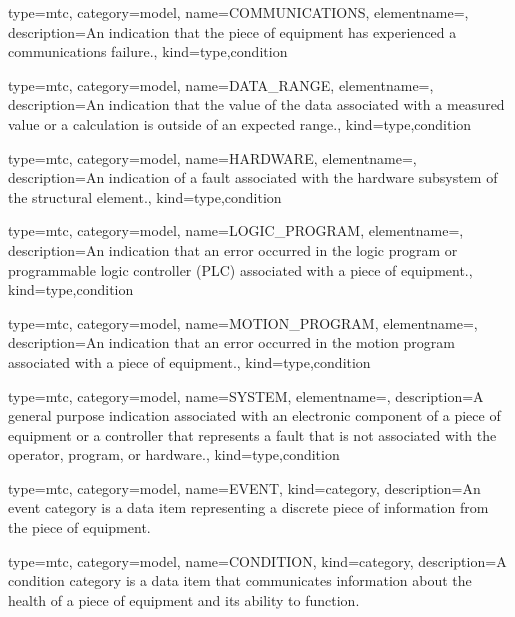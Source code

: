 {
  type=mtc,
  category=model,
  name={COMMUNICATIONS},
  elementname=,
  description={An indication that the piece of equipment has experienced a communications failure.},
  kind={type,condition}
}


{
  type=mtc,
  category=model,
  name={DATA\_RANGE},
  elementname=,
  description={An indication that the value of the data associated with a measured value or a calculation is outside of an expected range.},
  kind={type,condition}
}



{
  type=mtc,
  category=model,
  name={HARDWARE},
  elementname=,
  description={An indication of a fault associated with the hardware subsystem of the \gls{structural element}.},
  kind={type,condition}
}


{
  type=mtc,
  category=model,
  name={LOGIC\_PROGRAM},
  elementname=,
  description={An indication that an error occurred in the logic program or programmable logic controller (PLC) associated with a piece of equipment.},
  kind={type,condition}
}


{
  type=mtc,
  category=model,
  name={MOTION\_PROGRAM},
  elementname=,
  description={An indication that an error occurred in the motion program associated with a piece of equipment.},
  kind={type,condition}
}


{
  type=mtc,
  category=model,
  name={SYSTEM},
  elementname=,
  description={A general purpose indication associated with an electronic component of a piece of equipment or a controller that represents a fault that is not associated with the operator, program, or hardware.},
  kind={type,condition}
}


{
  type=mtc,
  category=model,
  name={EVENT},
  kind={category},
  description={An \gls{event category} is a data item representing a discrete piece of information from the piece of equipment. }
}


{
  type=mtc,
  category=model,
  name={CONDITION},
  kind={category},
  description={A \gls{condition category} is a data item that communicates information about the health of a piece of equipment and its ability to function. }
}


